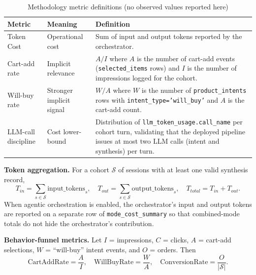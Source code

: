 \begin{table}[H]
\centering
\begin{tabular}{p{2.8cm}p{4.5cm}p{6.4cm}}
\toprule
\textbf{Metric} & \textbf{Meaning} & \textbf{Definition}\\
\midrule
Token Cost   & Operational cost          & Sum of input and output tokens reported by the orchestrator.\\
Cart-add rate & Implicit relevance       & $A/I$ where $A$ is the number of cart-add events (\texttt{selected\_items} rows) and $I$ is the number of impressions logged for the cohort.\\
Will-buy rate & Stronger implicit signal & $W/A$ where $W$ is the number of \texttt{product\_intents} rows with \texttt{intent\_type='will\_buy'} and $A$ is the cart-add count.\\
LLM-call discipline & Cost lower-bound  & Distribution of \texttt{llm\_token\_usage.call\_name} per cohort turn, validating that the deployed pipeline issues at most two LLM calls (intent and synthesis) per turn.\\
\bottomrule
\end{tabular}
\caption{Methodology metric definitions (no observed values reported here)}
\label{tab:metric_definitions}
\end{table}

\textbf{Token aggregation.}
For a cohort $\mathcal{S}$ of sessions with at least one valid synthesis record,
\begin{equation}
T_{in}=\sum_{s\in\mathcal{S}}\text{input\_tokens}_s,\quad
T_{out}=\sum_{s\in\mathcal{S}}\text{output\_tokens}_s,\quad
T_{total}=T_{in}+T_{out}.
\end{equation}
When agentic orchestration is enabled, the orchestrator's input and output tokens are reported on a separate row of \texttt{mode\_cost\_summary} so that combined-mode totals do not hide the orchestrator's contribution.

\textbf{Behavior-funnel metrics.}
Let $I$ = impressions, $C$ = clicks, $A$ = cart-add selections, $W$ = ``will-buy'' intent events, and $O$ = orders. Then
\begin{equation}
\text{CartAddRate}=\frac{A}{I},\quad
\text{WillBuyRate}=\frac{W}{A},\quad
\text{ConversionRate}=\frac{O}{|\mathcal{S}|}.
\end{equation}


